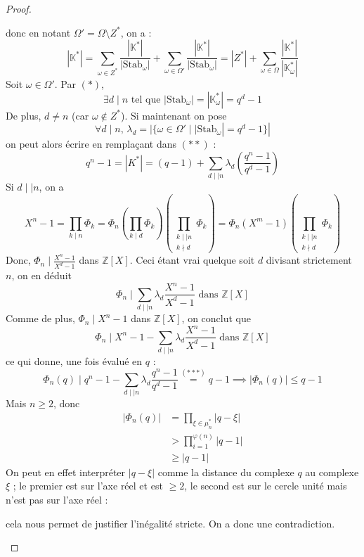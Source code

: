 \begin{proof}
\begin{itemize}
			donc en notant $\Omega' = \Omega \setminus Z^*$, on a :
			\[ |\mathbb{K}^*| = \sum_{\omega \in Z^*} \frac{|\mathbb{K}^*|}{|\mathrm{Stab}_\omega|} + \sum_{\omega \in \Omega'} \frac{|\mathbb{K}^*|}{|\mathrm{Stab}_\omega|} = |Z^*| + \sum_{\omega \in \Omega} \frac{|\mathbb{K}^*|}{|\mathbb{K}^*_\omega|} \tag{$**$} \]
			Soit $\omega \in \Omega'$. Par $(*)$,
			\[ \exists d \mid n \text{ tel que } |\mathrm{Stab}_\omega| = |\mathbb{K}^*_\omega| = q^d - 1 \]
			De plus, $d \neq n$ (car $\omega \notin Z^*$). Si maintenant on pose
			\[ \forall d \mid n, \, \lambda_d = |\{ \omega \in \Omega' \mid |\mathrm{Stab}_\omega| = q^d - 1 \}| \]
			on peut alors écrire en remplaçant dans $(**)$ :
			\[ q^n - 1 = |K^*| = (q - 1) + \sum_{d \mid \mid n} \lambda_d \left( \frac{q^n - 1}{q^d - 1} \right) \tag{$***$} \]
			Si $d \mid \mid n$, on a
			\[ X^n-1 = \prod_{k \mid n} \Phi_k = \Phi_n \left ( \prod_{k \mid d} \Phi_k \right ) \left ( \prod_{\substack{k \mid \mid n \\ k \nmid d}} \Phi_k \right ) = \Phi_n (X^m - 1) \left ( \prod_{\substack{k \mid \mid n \\ k \nmid d}} \Phi_k \right ) \]
			Donc, $\Phi_n \mid \frac{X^n - 1}{X^d - 1}$ dans $\mathbb{Z}[X]$. Ceci étant vrai quelque soit $d$ divisant strictement $n$, on en déduit
			\[ \Phi_n \mid \sum_{d \mid \mid n} \lambda_d \frac{X^n - 1}{X^d - 1} \text{ dans } \mathbb{Z}[X] \]
			Comme de plus, $\Phi_n \mid X^n - 1$ dans $\mathbb{Z}[X]$, on conclut que
			\[ \Phi_n \mid X^n - 1 - \sum_{d \mid \mid n} \lambda_d \frac{X^n - 1}{X^d - 1} \text{ dans } \mathbb{Z}[X] \]
			ce qui donne, une fois évalué en $q$ :
			\[ \Phi_n(q) \mid q^n - 1 - \sum_{d \mid \mid n} \lambda_d \frac{q^n - 1}{q^d - 1} \overset{(***)}{=} q-1 \implies |\Phi_n(q)| \leq q-1 \]
			Mais $n \geq 2$, donc
			\begin{align*}
				|\Phi_n(q)| &= \prod_{\xi \in \mu_n^*} |q - \xi| \\
				&> \prod_{i=1}^{\varphi(n)} |q - 1| \\
				&\geq |q-1|
			\end{align*}
			On peut en effet interpréter $|q - \xi|$ comme la distance du complexe $q$ au complexe $\xi$ ; le premier est sur l'axe réel et est $\geq 2$, le second est sur le cercle unité mais n'est pas sur l'axe réel :
			\begin{center}
			\end{center}
			cela nous permet de justifier l'inégalité stricte. On a donc une contradiction.
		\end{itemize}
	\end{proof}

